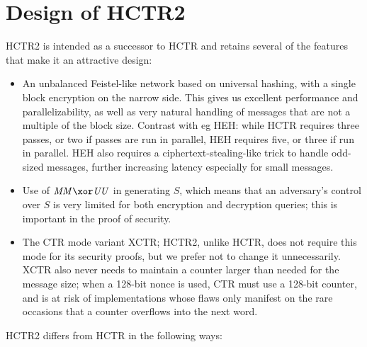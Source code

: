 \documentclass[hctr.tex]{subfiles}
\begin{document}
\section{Design of HCTR2}\label{design}
HCTR2 is intended as a successor to HCTR and retains several of the
features that make it an attractive design:
\begin{itemize}
    \item An unbalanced Feistel-like network based on universal
    hashing, with a single block encryption on the narrow side.
    This gives us excellent performance and parallelizability,
    as well as very natural handling of messages that are not
    a multiple of the block size. Contrast with eg HEH\cite{heh}:
    while HCTR requires three passes, or two if passes are
    run in parallel, HEH requires five, or three if run in parallel.
    HEH also requires a ciphertext-stealing-like trick to
    handle odd-sized messages, further increasing
    latency especially for small messages.
    \item Use of \(\MM \xor \UU\) in generating \(S\), which means
    that an adversary's control over \(S\) is very limited for both
    encryption and decryption queries; this is important in the
    proof of security.
    \item The CTR mode variant XCTR; HCTR2, unlike HCTR,
    does not require this mode for its security proofs, 
    but we prefer not to change it unnecessarily.
    XCTR also never needs to maintain a counter larger
    than needed for the message size;
    when a 128-bit nonce is used, CTR 
    must use a 128-bit counter, and is
    at risk of implementations
    whose flaws only manifest on the
    rare occasions that a counter overflows
    into the next word.
\end{itemize}

HCTR2 differs from HCTR in the following ways:
\end{document}
